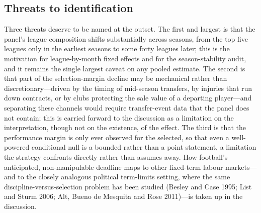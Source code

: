 \subsection{Threats to identification}
\label{sec:strategy-threats}

Three threats deserve to be named at the outset. The first and largest is that the
panel's league composition shifts substantially across seasons, from the top five
leagues only in the earliest seasons to some forty leagues later; this is the
motivation for league-by-month fixed effects and for the season-stability audit, and
it remains the single largest caveat on any pooled estimate. The second is that part
of the selection-margin decline may be mechanical rather than discretionary---driven
by the timing of mid-season transfers, by injuries that run down contracts, or by
clubs protecting the sale value of a departing player---and separating these channels
would require transfer-event data that the panel does not contain; this is carried
forward to the discussion as a limitation on the interpretation, though not on the
existence, of the effect. The third is that the performance margin is only ever
observed for the selected, so that even a well-powered conditional null is a bounded
rather than a point statement, a limitation the strategy confronts directly rather
than assumes away. How football's anticipated, non-manipulable deadline maps to
other fixed-term labour markets---and to the closely analogous political
term-limits setting, where the same discipline-versus-selection problem has been
studied (Besley and Case 1995; List and Sturm 2006; Alt, Bueno de Mesquita and Rose
2011)---is taken up in the discussion.
